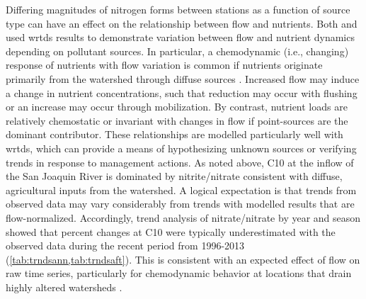 \documentclass[letterpaper,12pt,oneside]{article}\usepackage[]{graphicx}\usepackage[]{color}
\begin{document}
Differing magnitudes of nitrogen forms between stations as a function of source type can have an effect on the relationship between flow and nutrients.  Both \citet{Hirsch10} and \citet{Beck15} used \ac{wrtds} results to demonstrate variation between flow and nutrient dynamics depending on pollutant sources.  In particular, a chemodynamic (i.e., changing) response of nutrients with flow variation is common if nutrients originate primarily from the watershed through diffuse sources \citep{Thompson11,Wan17}.  Increased flow may induce a change in nutrient concentrations, such that reduction may occur with flushing or an increase may occur through mobilization.  By contrast, nutrient loads are relatively chemostatic or invariant with changes in flow if point-sources are the dominant contributor.  These relationships are modelled particularly well with \ac{wrtds}, which can provide a means of hypothesizing unknown sources or verifying trends in response to management actions.  As noted above, C10 at the inflow of the San Joaquin River is dominated by nitrite/nitrate consistent with diffuse, agricultural inputs from the watershed.  A logical expectation is that trends from observed data may vary considerably from trends with modelled results that are flow-normalized.  Accordingly, trend analysis of nitrate/nitrate by year and season showed that percent changes at C10 were typically underestimated with the observed data during the recent period from 1996-2013 (\cref{tab:trndsann,tab:trndsaft}).  This is consistent with an expected effect of flow on raw time series, particularly for chemodynamic behavior at locations that drain highly altered watersheds \citep{Wan17}.
\end{document}
